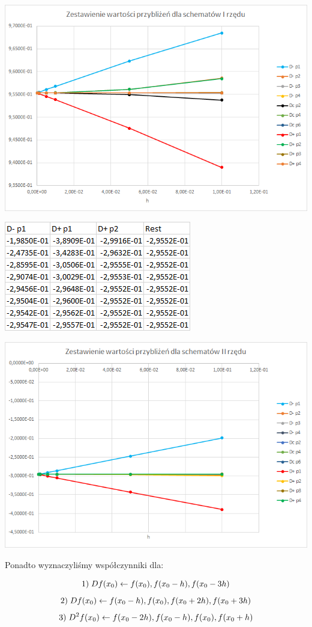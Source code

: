 \includegraphics{Lab2/charts/rz1_e.png}
\newpage


\includegraphics{Lab2/charts/rz2_e_dane.png}

\includegraphics{Lab2/charts/rz2_e.png}

\vspace{1cm}
Ponadto wyznaczyliśmy współczynniki dla:

$$1)\hspace{1mm}Df(x_{0}) \leftarrow f(x_{0}), f(x_{0}-h), f(x_{0}-3h)$$
$$2)\hspace{1mm}Df(x_{0}) \leftarrow f(x_{0}-h), f(x_{0}), f(x_{0}+2h), f(x_{0}+3h)$$
$$3)\hspace{1mm}D^2f(x_{0}) \leftarrow f(x_{0}-2h), f(x_{0}-h), f(x_{0}), f(x_{0}+h)$$

